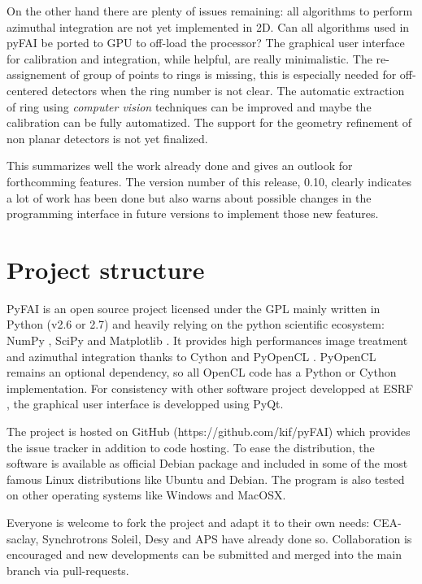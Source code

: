 \documentclass[preprint]{iucr}
\begin{document}
On the other hand there are plenty of issues remaining: all algorithms to
perform azimuthal integration are not yet implemented in 2D. 
Can all algorithms used in
pyFAI be ported to GPU to off-load the processor? The graphical user interface
for calibration and integration, while helpful, are really minimalistic.
The re-assignement of group of points to rings is missing, this is
especially needed for off-centered detectors when the ring number is not clear.
The automatic extraction of ring using \textit{computer vision} techniques can
be improved and maybe the calibration can be fully automatized.
The support for the geometry refinement of non planar detectors is not yet
finalized.

This summarizes well the work already done and gives an
outlook for forthcomming features.
The version number of this release, 0.10, clearly indicates a lot of work has
been done but also warns about possible changes in the programming interface
in future versions to implement those new features.




\appendix
\section{Project structure}

PyFAI is an open source project licensed under the GPL mainly written in Python (v2.6 or 2.7)
and heavily relying on the python scientific ecosystem: NumPy \cite{numpy},
SciPy \cite{scipy} and Matplotlib \cite{matplotlib}.
It provides high performances image treatment and azimuthal integration thanks
to Cython \cite{cython} and PyOpenCL \cite{pyopencl}.
PyOpenCL remains an optional dependency, so all OpenCL code has a
Python or Cython implementation.
For consistency with other software project developped at ESRF \cite{pymca},
the graphical user interface is developped using PyQt.

The project is hosted on GitHub (https://github.com/kif/pyFAI) which provides
the issue tracker in addition to code hosting.
To ease the distribution, the
software is available as official Debian package and included in some of the
most famous Linux distributions like Ubuntu and Debian.
The program is also tested on other operating systems like Windows and
MacOSX.

Everyone is welcome to fork the project and adapt it to their own needs: CEA-saclay,
Synchrotrons Soleil, Desy and APS have already done so. Collaboration is encouraged and
new developments can be submitted and merged into the main branch
via pull-requests.
\end{document}
